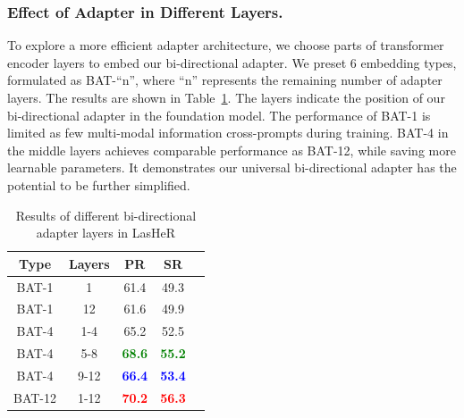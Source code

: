 \documentclass[letterpaper]{article} %
\begin{document}
\subsubsection{Effect of Adapter in Different Layers.}

To explore a more efficient adapter architecture, we choose parts of transformer encoder layers to embed our bi-directional adapter.
We preset 6 embedding types, formulated as BAT-``n'', where ``n'' represents the remaining number of adapter layers.
The results are shown in Table~\ref{tabadapternum}. The layers indicate the position of our bi-directional adapter in the foundation model. 
The performance of BAT-1 is limited as few multi-modal information cross-prompts during training.
BAT-4 in the middle layers achieves comparable performance as BAT-12, while saving more learnable parameters. It demonstrates our universal bi-directional adapter has the potential to be further simplified.



\begin{table}[t]
\caption{Results of different bi-directional adapter layers in LasHeR}
\centering
\begin{tabular}{ccccc}
\toprule
Type&Layers&PR&SR \\
\midrule
BAT-1&1&  61.4  &49.3 \\
BAT-1&12&  61.6 &49.9 \\
BAT-4&1-4&  65.2&52.5 \\
BAT-4&5-8&  \textbf{\textcolor{green}{68.6}}&\textbf{\textcolor{green}{55.2}} \\
BAT-4&9-12&\textbf{\textcolor{blue}{66.4}} &\textbf{\textcolor{blue}{53.4}} \\
BAT-12&1-12&\textbf{\textcolor{red}{70.2}} &\textbf{\textcolor{red}{56.3}} \\
\bottomrule
\end{tabular}
\label{tabadapternum}
\end{table}
\end{document}
